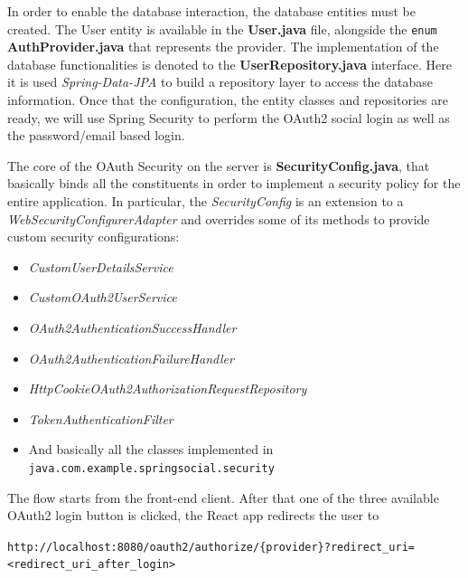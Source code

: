 In order to enable the database interaction, the database entities must be created. The User entity is available in the \textbf{User.java} file, alongside the \texttt{enum} \textbf{AuthProvider.java} that represents the provider. The implementation of the database functionalities is denoted to the \textbf{UserRepository.java} interface. Here it is used \textit{Spring-Data-JPA} to build a repository layer to access the database information.
Once that the configuration, the entity classes and repositories are ready, we will use Spring Security to perform the OAuth2 social login as well as the password/email based login.

The core of the OAuth Security on the server is \textbf{SecurityConfig.java}, that basically binds all the constituents in order to implement a security policy for the entire application. In particular, the \textit{SecurityConfig} is an extension to a  \textit{WebSecurityConfigurerAdapter} and overrides some of its methods to provide custom security configurations:

\begin{itemize}
    \item \textit{CustomUserDetailsService}
    \item \textit{CustomOAuth2UserService}
    \item \textit{OAuth2AuthenticationSuccessHandler}
    \item \textit{OAuth2AuthenticationFailureHandler}
    \item \textit{HttpCookieOAuth2AuthorizationRequestRepository}
    \item \textit{TokenAuthenticationFilter}
    \item And basically all the classes implemented in \texttt{java.com.example.springsocial.security}
\end{itemize}

\noindent The flow starts from the front-end client. After that one of the three available OAuth2 login button is clicked, the React app redirects the user to \\

\vspace{0.1cm}

\hypertarget{foo}{}

\texttt{\footnotesize{http://localhost:8080/oauth2/authorize/\{provider\}?redirect\_uri=<redirect\_uri\_after\_login>}} \\

\vspace{0.1cm}

